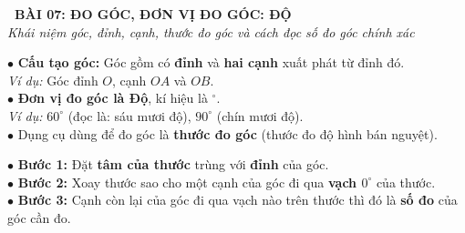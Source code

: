 \documentclass[14pt,a4paper,oneside]{extbook}
\begin{document}
\noindent
\begin{tcolorbox}[
  enhanced,
  colback=teal!8!white,
  colframe=teal!80!black,
  arc=3mm, boxrule=1pt,
  left=3mm, right=3mm, top=2mm, bottom=2mm,
  halign=center
]
  {\Large\bfseries\color{teal!90!black}\faBookmark\ BÀI 07: ĐO GÓC, ĐƠN VỊ ĐO GÓC: ĐỘ}\\[1.5pt]
  {\footnotesize\itshape\color{black!75} Khái niệm góc, đỉnh, cạnh, thước đo góc và cách đọc số đo góc chính xác}
\end{tcolorbox}

\vspace{2.5mm}

\noindent
\begin{minipage}[t]{0.49\textwidth}
  \begin{tcolorbox}[
    enhanced,
    title={\footnotesize\bfseries\color{white}\faCompass\ 1. Khái niệm Góc \& Đơn vị đo},
    colback=blue!2!white,
    colframe=blue!75!black,
    arc=2.5mm, boxrule=0.8pt, top=1.8mm, bottom=1.8mm, left=2mm, right=2mm
  ]
    \footnotesize
    $\bullet$ \textbf{Cấu tạo góc:} Góc gồm có \textbf{đỉnh} và \textbf{hai cạnh} xuất phát từ đỉnh đó.\\
    \textit{Ví dụ:} Góc đỉnh $O$, cạnh $OA$ và $OB$.\\
    $\bullet$ \textbf{Đơn vị đo góc là Độ}, kí hiệu là $^\circ$.\\
    \textit{Ví dụ:} $60^\circ$ (đọc là: sáu mươi độ), $90^\circ$ (chín mươi độ).\\
    $\bullet$ Dụng cụ dùng để đo góc là \textbf{thước đo góc} (thước đo độ hình bán nguyệt).
  \end{tcolorbox}
\end{minipage}%
\hfill
\begin{minipage}[t]{0.49\textwidth}
  \begin{tcolorbox}[
    enhanced,
    title={\footnotesize\bfseries\color{white}\faSliders\ 2. Quy trình 3 bước đo góc},
    colback=teal!2!white,
    colframe=teal!75!black,
    arc=2.5mm, boxrule=0.8pt, top=1.8mm, bottom=1.8mm, left=2mm, right=2mm
  ]
    \footnotesize
    $\bullet$ \textbf{Bước 1:} Đặt \textbf{tâm của thước} trùng với \textbf{đỉnh} của góc.\\
    $\bullet$ \textbf{Bước 2:} Xoay thước sao cho một cạnh của góc đi qua \textbf{vạch $0^\circ$} của thước.\\
    $\bullet$ \textbf{Bước 3:} Cạnh còn lại của góc đi qua vạch nào trên thước thì đó là \textbf{số đo} của góc cần đo.
  \end{tcolorbox}
\end{minipage}
\end{document}
